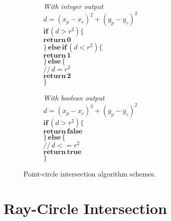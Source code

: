 \begin{figure}[htbp]
\hfill
	\begin{subfigure}[t]{.4\linewidth}
		\raggedright
		\textit{With integer output}\\
		\vspace{.5em}
		$d = (x_p-x_c)^2 + (y_p-y_c)^2$\\
		$\mathbf{if} \, (d > r^2) \{$\\
		\quad $\mathbf{return \, 0}$\\
		$\} \, \mathbf{else \, if} \, (d < r^2) \{$\\
		\quad $\mathbf{return \, 1}$\\
		$\} \, \mathbf{else} \, \{$\\
		\quad $\slash\slash \, d = r^2$\\
		\quad $\mathbf{return \, 2}$\\
		$\}$\\
	\end{subfigure}
\hfill
	\begin{subfigure}[t]{.4\textwidth}
		\raggedright
		\textit{With boolean output}\\
		\vspace{.5em}
		$d = (x_p-x_c)^2 + (y_p-y_c)^2$\\
		$\mathbf{if} \, (d > r^2) \{$\\
		\quad $\mathbf{return \, false}$\\
		$\} \, \mathbf{else} \, \{$\\
		\quad $\slash\slash \, d <= r^2$\\
		\quad $\mathbf{return \, true}$\\
		$\}$\\		
	\end{subfigure}
\hfill
\caption{Point-circle intersection algorithm schemes.}
\label{Pointcircle}
\end{figure}
%
\section{Ray-Circle Intersection}

%
